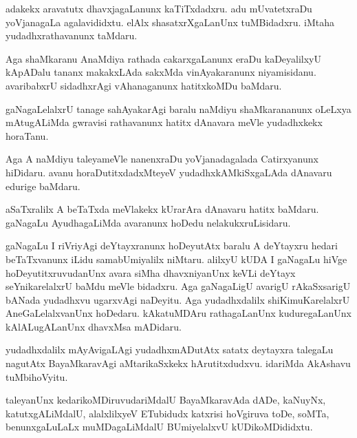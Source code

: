 \documentclass{article}
\begin{document}
\begin{mn}%
adakekx aravatutx dhavxjagaLanunx kaTiTxdadxru. adu mUvatetxraDu yoVjanagaLa agalavididxtu. 
elAlx shasatxrXgaLanUnx tuMBidadxru. iMtaha yudadhxrathavanunx taMdaru.
\end{mn}

\begin{mn}%
Aga shaMkaranu AnaMdiya rathada cakarxgaLanunx eraDu kaDeyalilxyU kApADalu tananx makakxLAda 
sakxMda vinAyakaranunx niyamisidanu. avaribabxrU sidadhxrAgi vAhanaganunx hatitxkoMDu 
baMdaru.
\end{mn}

\begin{mn}%
gaNagaLelalxrU tanage sahAyakarAgi baralu naMdiyu shaMkarananunx oLeLxya mAtugALiMda 
gwravisi rathavanunx hatitx dAnavara meVle yudadhxkekx horaTanu.
\end{mn}

\begin{mn}%
Aga A naMdiyu taleyameVle nanenxraDu yoVjanadagalada Catirxyanunx hiDidaru. avanu 
horaDutitxdadxMteyeV yudadhxkAMkiSxgaLAda dAnavaru edurige baMdaru.
\end{mn}

\begin{mn}%
aSaTxralilx A beTaTxda meVlakekx kUrarAra dAnavaru hatitx baMdaru. gaNagaLu AyudhagaLiMda 
avaranunx hoDedu nelakukxruLisidaru.
\end{mn}

\begin{mn}%
gaNagaLu I riVriyAgi deYtayxranunx hoDeyutAtx baralu A deYtayxru hedari beTaTxvanunx iLidu 
samabUmiyalilx niMtaru. alilxyU kUDA I gaNagaLu hiVge hoDeyutitxruvudanUnx avara siMha 
dhavxniyanUnx keVLi deYtayx seYnikarelalxrU baMdu meVle bidadxru. Aga gaNagaLigU avarigU 
rAkaSxsarigU bANada yudadhxvu ugarxvAgi naDeyitu. Aga yudadhxdalilx shiKimuKarelalxrU 
AneGaLelalxvanUnx hoDedaru. kAkatuMDAru rathagaLanUnx kuduregaLanUnx kAlALugALanUnx 
dhavxMsa mADidaru.
\end{mn}

\begin{mn}%
yudadhxdalilx mAyAvigaLAgi yudadhxmADutAtx satatx deytayxra talegaLu nagutAtx BayaMkaravAgi 
aMtarikaSxkekx hArutitxdudxvu. idariMda AkAshavu tuMbihoVyitu.
\end{mn}

\begin{mn}%
taleyanUnx kedarikoMDiruvudariMdalU BayaMkaravAda dADe, kaNuyNx, katutxgALiMdalU, 
alalxlilxyeV ETubidudx katxrisi hoVgiruva toDe, soMTa, benunxgaLuLaLx muMDagaLiMdalU 
BUmiyelalxvU kUDikoMDididxtu. 
\end{mn}
\end{document}
